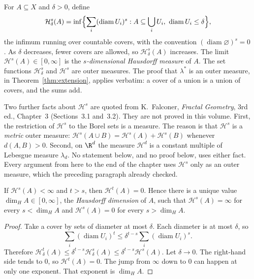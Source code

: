For $A\subseteq X$ and $\delta>0$, define
\[\mathcal H^s_\delta(A)=\inf\Bigl\{\sum_i(\operatorname{diam}U_i)^s:A\subseteq\bigcup_iU_i,\ \operatorname{diam}U_i\le\delta\Bigr\},\]
the infimum running over countable covers, with the convention $(\operatorname{diam}\varnothing)^s=0$. As $\delta$ decreases, fewer covers are allowed, so
$\mathcal H^s_\delta(A)$ increases. The limit $\mathcal H^s(A)\in[0,\infty]$ is the \emph{$s$-dimensional Hausdorff measure} of $A$. The set
functions $\mathcal H^s_\delta$ and $\mathcal H^s$ are outer measures. The proof that $\lambda^*$ is an outer measure, in
Theorem~\ref{thm:extension}, applies verbatim: a cover of a union is a union of covers, and the sums add.

\begin{remark}\label{rem:hausdorffquoted}
Two further facts about $\mathcal H^s$ are quoted from K.~Falconer, \emph{Fractal Geometry}, 3rd ed., Chapter~3 (Sections~3.1 and~3.2). They
are not proved in this volume. First, the restriction of $\mathcal H^s$ to the Borel sets is a measure. The reason is that $\mathcal H^s$ is a
\emph{metric} outer measure: $\mathcal H^s(A\cup B)=\mathcal H^s(A)+\mathcal H^s(B)$ whenever $d(A,B)>0$. Second, on $\R^d$ the measure
$\mathcal H^d$ is a constant multiple of Lebesgue measure $\lambda_d$. No statement below, and no proof below, uses either fact. Every
argument from here to the end of the chapter uses $\mathcal H^s$ only as an outer measure, which the preceding paragraph already checked.
\end{remark}

\begin{proposition}\label{prop:jump}
If $\mathcal H^s(A)<\infty$ and $t>s$, then $\mathcal H^t(A)=0$. Hence there is a unique value $\dim_H A\in[0,\infty]$, the \emph{Hausdorff
dimension} of $A$, such that $\mathcal H^s(A)=\infty$ for every $s<\dim_H A$ and $\mathcal H^s(A)=0$ for every $s>\dim_H A$.
\end{proposition}
\begin{proof}
Take a cover by sets of diameter at most $\delta$. Each diameter is at most $\delta$, so
\[\sum_i(\operatorname{diam}U_i)^t\le\delta^{t-s}\sum_i(\operatorname{diam}U_i)^s.\]
Therefore $\mathcal H^t_\delta(A)\le\delta^{t-s}\mathcal H^s_\delta(A)\le\delta^{t-s}\mathcal H^s(A)$. Let $\delta\to 0$. The right-hand side
tends to $0$, so $\mathcal H^t(A)=0$. The jump from $\infty$ down to $0$ can happen at only one exponent. That exponent is $\dim_H A$.
\end{proof}

